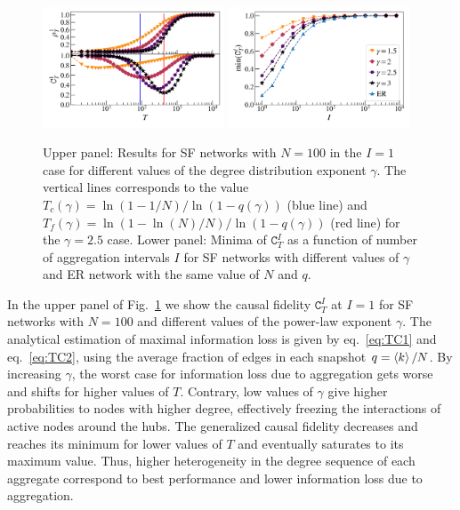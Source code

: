 \documentclass[%
 reprint,
 amsmath,amssymb,
 aps,
]{revtex4-2}
\begin{document}
\begin{figure}[]
\includegraphics[width=0.48\textwidth]{fig/SF_cr_ana.png}
\includegraphics[width=0.48\textwidth]{fig/SF_min.png}

\caption{\label{fig:SFcf}
Upper panel: Results for SF networks with $N=100$ in the  $I=1$ case for different values of the degree distribution exponent $\gamma$. The vertical lines corresponds to the value $T_c(\gamma)={\ln(1-1/{N})}/{\ln(1-q(\gamma))}$ (blue line) and $T_f(\gamma)={\ln(1-{\ln(N)}/{N})}/{\ln(1-q(\gamma))}$ (red line) for the $\gamma=2.5$ case.
Lower panel: Minima of $\mathtt{C}^I_T$ as a function of number of aggregation intervals $I$ for SF networks with different values of $\gamma$ and ER network with the same value of $N$ and $q$.
}
\end{figure}

In the upper panel of Fig.~\ref{fig:SFcf} we show the causal fidelity $\mathtt{C}^I_T$ at $I=1$ for SF networks with $N=100$ and different values of the power-law exponent $\gamma$.
The analytical estimation of maximal information loss is given by eq.~\eqref{eq:TC1} and eq.~\eqref{eq:TC2}, using the average fraction of edges in each snapshot $q=\braket{k}/N$. 
By increasing $\gamma$, the worst case for information loss due to aggregation gets worse and shifts for higher values of $T$. Contrary,  low values of $\gamma$ give higher probabilities to nodes with higher degree, effectively freezing the interactions of active nodes around the hubs. The generalized causal fidelity decreases and reaches its minimum for lower values of $T$ and eventually saturates to its maximum value. 
Thus, higher heterogeneity in the degree sequence of each aggregate correspond to best performance and lower information loss due to aggregation.
\end{document}
